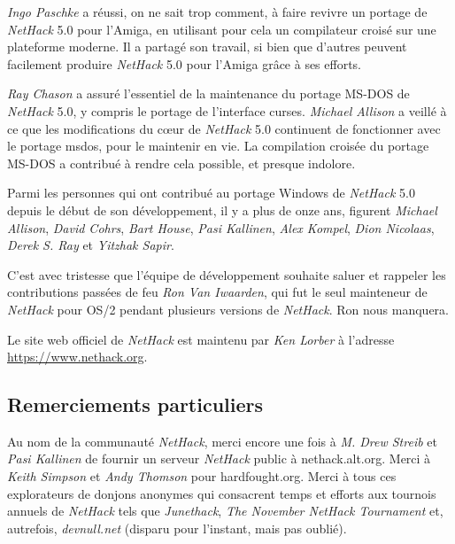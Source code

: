 \documentclass[titlepage]{article}
\begin{document}
\medskip
\textit{Ingo Paschke} a réussi, on ne sait trop comment, à faire revivre un portage de \textit{NetHack} 5.0
pour l'Amiga, en utilisant pour cela un compilateur croisé sur une plateforme moderne. Il a partagé
son travail, si bien que d'autres peuvent facilement produire \textit{NetHack} 5.0 pour l'Amiga grâce à
ses efforts.

\medskip
\textit{Ray Chason} a assuré l'essentiel de la maintenance du
portage MS-DOS de \textit{NetHack} 5.0, y compris le portage de l'interface curses.
\textit{Michael Allison} a veillé à ce que les modifications du cœur de \textit{NetHack} 5.0
continuent de fonctionner avec le portage msdos, pour le maintenir en vie.  La compilation croisée
du portage MS-DOS a contribué à rendre cela possible, et presque indolore.

\medskip
Parmi les personnes qui ont contribué au portage Windows de \textit{NetHack} 5.0 depuis le
début de son développement, il y a plus de onze ans, figurent
\textit{Michael Allison}, \textit{David Cohrs}, \textit{Bart House},
\textit{Pasi Kallinen}, \textit{Alex Kompel}, \textit{Dion Nicolaas},
\textit{Derek S. Ray} et \textit{Yitzhak Sapir}.

\medskip
C'est avec tristesse que l'équipe de développement souhaite saluer et rappeler les
contributions passées de feu \textit{Ron Van Iwaarden}, qui fut le seul mainteneur
de \textit{NetHack} pour OS/2 pendant plusieurs versions de \textit{NetHack}. Ron nous manquera.

\medskip
\noindent Le site web officiel de \textit{NetHack} est maintenu par \textit{Ken Lorber} à l'adresse
\url{https://www.nethack.org}.


\subsection*{Remerciements particuliers}
\noindent Au nom de la communauté \textit{NetHack}, merci encore une fois
à \textit{M. Drew Streib} et \textit{Pasi Kallinen} de fournir un
serveur \textit{NetHack} public à nethack.alt.org. Merci à \textit{Keith Simpson}
et \textit{Andy Thomson} pour hardfought.org. Merci à tous ces
explorateurs de donjons anonymes qui consacrent temps et efforts aux tournois
annuels de \textit{NetHack} tels que \textit{Junethack},
\textit{The November NetHack Tournament} et, autrefois,
\textit{devnull.net} (disparu pour l'instant, mais pas oublié).
\clearpage

\end{document}
